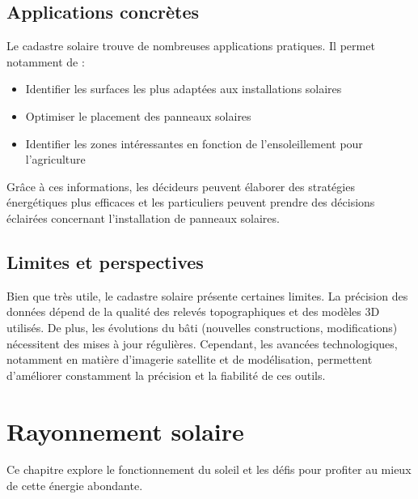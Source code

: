 \subsection{Applications concrètes}
\par{Le cadastre solaire trouve de nombreuses applications pratiques. Il permet notamment de :
\begin{itemize}
    \item Identifier les surfaces les plus adaptées aux installations solaires
    \item Optimiser le placement des panneaux solaires
    \item Identifier les zones intéressantes en fonction de l’ensoleillement pour l'agriculture
\end{itemize}}
\par{Grâce à ces informations, les décideurs peuvent élaborer des stratégies énergétiques plus efficaces et les particuliers peuvent prendre des décisions éclairées concernant l'installation de panneaux solaires.}

\subsection{Limites et perspectives}
\par{Bien que très utile, le cadastre solaire présente certaines limites. La précision des données dépend de la qualité des relevés topographiques et des modèles 3D utilisés. De plus, les évolutions du bâti (nouvelles constructions, modifications) nécessitent des mises à jour régulières. Cependant, les avancées technologiques, notamment en matière d'imagerie satellite et de modélisation, permettent d'améliorer constamment la précision et la fiabilité de ces outils.}

\section{Rayonnement solaire}

\par{Ce chapitre explore le fonctionnement du soleil et les défis pour profiter au mieux de cette énergie abondante.}

